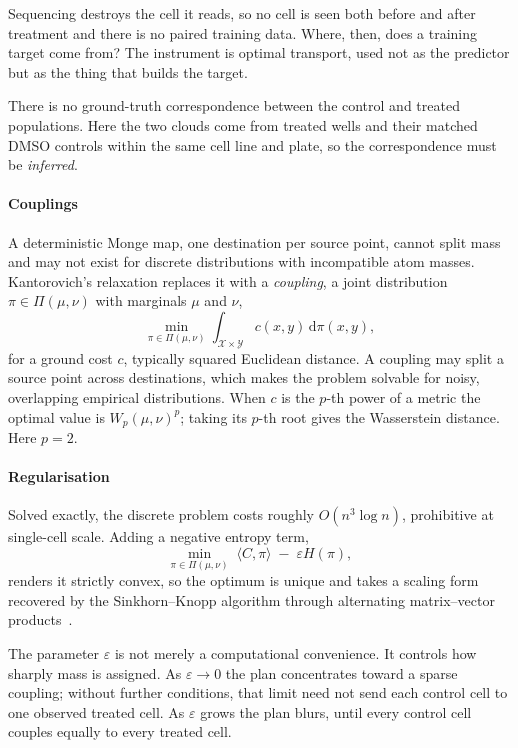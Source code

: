 \begin{question}
Sequencing destroys the cell it reads, so no cell is seen both before and after
treatment and there is no paired training data. Where, then, does a training
target come from? The instrument is optimal transport, used not as the predictor
but as the thing that builds the target.
\end{question}

\noindent
There is no ground-truth correspondence between the control and treated
populations. Here the two clouds come from treated wells and their matched
DMSO controls within the same cell line and plate, so the correspondence must
be \emph{inferred}.

\paragraph{Couplings} A deterministic Monge map, one destination per source
point, cannot split mass and may not exist for discrete distributions with
incompatible atom masses. Kantorovich's
relaxation replaces it with a \emph{coupling}, a joint distribution
$\pi \in \Pi(\mu,\nu)$ with marginals $\mu$ and $\nu$,
\begin{equation}
  \min_{\pi \in \Pi(\mu,\nu)} \int_{\mathcal{X}\times\mathcal{Y}}
  c(x,y)\,\mathrm{d}\pi(x,y),
\end{equation}
for a ground cost $c$, typically squared Euclidean distance. A coupling may split
a source point across destinations, which makes the problem solvable for noisy,
overlapping empirical distributions. When $c$ is the $p$-th power of a metric the
optimal value is $W_p(\mu,\nu)^p$; taking its $p$-th root gives the
Wasserstein distance. Here $p=2$.

\paragraph{Regularisation}
Solved exactly, the discrete problem costs roughly $O(n^3 \log n)$, prohibitive
at single-cell scale. Adding a negative entropy term,
\begin{equation}
  \min_{\pi \in \Pi(\mu,\nu)} \; \langle C, \pi \rangle \;-\;
  \varepsilon H(\pi),
\end{equation}
renders it strictly convex, so the optimum is unique and takes a scaling form
recovered by the Sinkhorn--Knopp algorithm through alternating matrix--vector
products~\cite{cuturi}.

The parameter $\varepsilon$ is not merely a computational convenience. It
controls how sharply mass is assigned. As $\varepsilon \rightarrow 0$ the plan
concentrates toward a sparse coupling; without further conditions, that limit
need not send each control cell to one observed treated cell. As $\varepsilon$
grows the plan blurs, until every control cell couples equally to every treated
cell.

